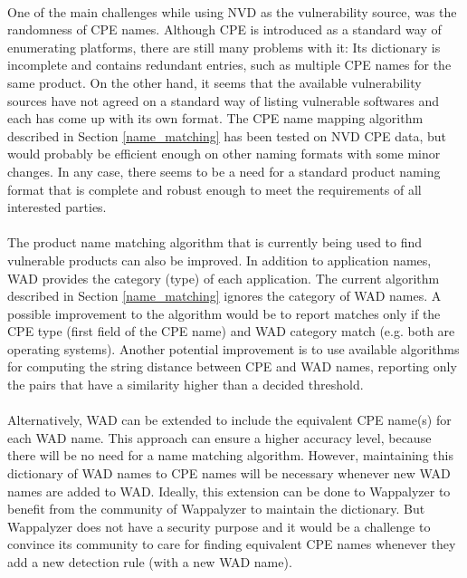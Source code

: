 \paragraph{}
One of the main challenges while using NVD as the vulnerability source, was the randomness of CPE names. Although CPE is introduced as a standard way of enumerating platforms, there are still many problems with it: Its dictionary is incomplete and contains redundant entries, such as multiple CPE names for the same product. On the other hand, it seems that the available vulnerability sources have not agreed on a standard way of listing vulnerable softwares and each has come up with its own format. The CPE name mapping algorithm described in Section \ref{name_matching} has been tested on NVD CPE data, but would probably be efficient enough on other naming formats with some minor changes. In any case, there seems to be a need for a standard product naming format that is complete and robust enough to meet the requirements of all interested parties. 

\paragraph{}
The product name matching algorithm that is currently being used to find vulnerable products can also be improved. In addition to application names, WAD provides the category (type) of each application. The current algorithm described in Section \ref{name_matching} ignores the category of WAD names. A possible improvement to the algorithm would be to report matches only if the CPE type (first field of the CPE name) and WAD category match (e.g. both are operating systems). Another potential improvement is to use available algorithms for computing the string distance between CPE and WAD names, reporting only the pairs that have a similarity higher than a decided threshold.  

\paragraph{}
Alternatively, WAD can be extended to include the equivalent CPE name(s) for each WAD name. This approach can ensure a higher accuracy level, because there will be no need for a name matching algorithm. However, maintaining this dictionary of WAD names to CPE names will be necessary whenever new WAD names are added to WAD. Ideally, this extension can be done to Wappalyzer to benefit from the community of Wappalyzer to maintain the dictionary. But Wappalyzer does not have a security purpose and it would be a challenge to convince its community to care for finding equivalent CPE names whenever they add a new detection rule (with a new WAD name). 

